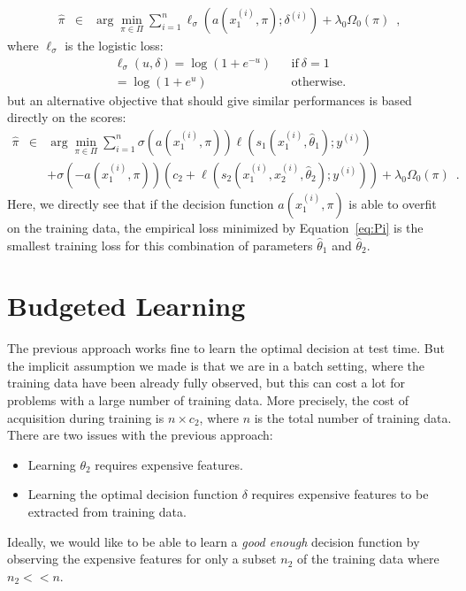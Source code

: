 \documentclass{article}
\newcommand{\loss}{\ell}
\begin{document}
\begin{eqnarray}
\hat\pi &\in & \arg\min_{\pi\in\Pi} \sum_{i=1}^n \loss_\sigma(a(x_1^{(i)},\pi);\delta^{(i)}) + \lambda_0 \Omega_0(\pi)
\enspace,
\label{eq:Pi0}
\end{eqnarray}
where $\ell_\sigma$ is the logistic loss:
\begin{eqnarray}
\ell_\sigma(u,\delta)= \log(1+e^{-u}) && \mathrm{if}\  \delta=1
\nonumber\\
= \log(1+e^{u})&&\mathrm{otherwise.}
\end{eqnarray}
but an alternative objective that should give similar performances is based directly on the scores: 
\begin{eqnarray}
\hat\pi &\in & \arg\min_{\pi\in\Pi} \sum_{i=1}^n \sigma(a(x_1^{(i)},\pi)) \loss(s_1(x_1^{(i)},\hat\theta_1);y^{(i)})
\nonumber \\
&&+ \sigma(-a(x_1^{(i)},\pi)) (c_2+\loss(s_2(x_1^{(i)},x_2^{(i)},\hat\theta_2);y^{(i)}))
+ \lambda_0 \Omega_0(\pi)
\label{eq:Pi}
\enspace.
\end{eqnarray}
Here, we directly see that if the decision function $a(x_1^{(i)},\pi)$ is able to overfit on the training data, the empirical loss minimized by Equation~\eqref{eq:Pi} is the smallest training loss for this combination of parameters $\hat\theta_1$ and $\hat\theta_2$.

\section{Budgeted Learning}
The previous approach works fine to learn the optimal decision at test time. But the implicit assumption we made is that we are in a batch setting, where the training data have been already fully observed, but this can cost a lot for problems with a large number of training data. More precisely, the cost of acquisition during training is $n \times c_2$, where $n$ is the total number of training data. 
There are two issues with the previous approach:
\begin{itemize}
\item Learning $\theta_2$ requires expensive features.
\item Learning the optimal decision function $\delta$ requires expensive features to be extracted from training data.
\end{itemize}

Ideally, we would like to be able to learn a \emph{good enough} decision function by observing the expensive features for only a subset $n_2$ of the training data where $n_2<<n$. 
\end{document}
